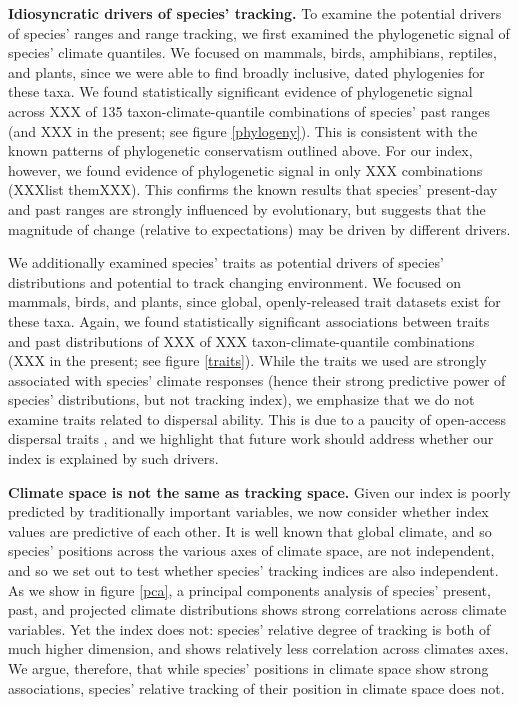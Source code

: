 \documentclass[12pt]{report}
\begin{document}
\textbf{Idiosyncratic drivers of species' tracking.} To examine the
potential drivers of species' ranges and range tracking, we first
examined the phylogenetic signal of species' climate quantiles. We
focused on mammals\supercite{xxx}, birds\supercite{xxx},
amphibians\supercite{xxx}, reptiles\supercite{xxx}, and
plants\supercite{xxx}, since we were able to find broadly inclusive,
dated phylogenies for these taxa. We found statistically significant
evidence of phylogenetic signal across XXX of 135
taxon-climate-quantile combinations of species' past ranges (and XXX
in the present; see figure \ref{phylogeny}). This is consistent with
the known patterns of phylogenetic conservatism outlined above. For
our index, however, we found evidence of phylogenetic signal in only
XXX combinations (XXXlist themXXX). This confirms the known results
that species' present-day and past ranges are strongly influenced by
evolutionary, but suggests that the magnitude of change (relative to
expectations) may be driven by different drivers.

We additionally examined species' traits as potential drivers of
species' distributions and potential to track changing environment. We
focused on mammals\supercite{xxx}, birds\supercite{xxx}, and
plants\supercite{xxx}, since global, openly-released trait datasets
exist for these taxa. Again, we found statistically significant
associations between traits and past distributions of XXX of XXX
taxon-climate-quantile combinations (XXX in the present; see figure
\ref{traits}). While the traits we used are strongly associated with
species' climate responses\supercite{xxx} (hence their strong
predictive power of species' distributions, but not tracking index),
we emphasize that we do not examine traits related to dispersal
ability. This is due to a paucity of open-access dispersal traits
\supercite{xxx}, and we highlight that future work should address
whether our index is explained by such drivers.

\textbf{Climate space is not the same as tracking space.} Given our
index is poorly predicted by traditionally important variables, we now
consider whether index values are predictive of each other. It is well
known that global climate\supercite{xxx}, and so species' positions
across the various axes of climate space\supercite{xxx}, are not
independent, and so we set out to test whether species' tracking
indices are also independent. As we show in figure \ref{pca}, a
principal components analysis of species' present, past, and projected
climate distributions shows strong correlations across climate
variables. Yet the index does not: species' relative degree of
tracking is both of much higher dimension, and shows relatively less
correlation across climates axes. We argue, therefore, that while
species' positions in climate space show strong associations, species'
relative tracking of their position in climate space does not.
\end{document}
